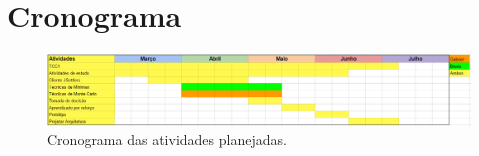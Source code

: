 \section{\label{sec:crono}Cronograma}

    \begin{figure}[H]
      \centering
      \includegraphics[width=1\textwidth]{crono.PNG}
      \caption{Cronograma das atividades planejadas.}
    \end{figure}


